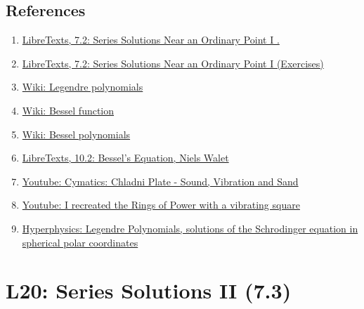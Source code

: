 \documentclass[
  letterpaper,
  DIV=11,
  numbers=noendperiod]{scrreprt}
\theoremstyle{plain}
\theoremstyle{remark}
\begin{document}
\section{References}\label{references-1}

\begin{enumerate}
\def\labelenumi{\arabic{enumi}.}
\item
  \href{https://math.libretexts.org/Courses/Monroe_Community_College/MTH_225_Differential_Equations/7\%3A_Series_Solutions_of_Linear_Second_Order_Equations/7.2\%3A_Series_Solutions_Near_an_Ordinary_Point_I}{LibreTexts,
  7.2: Series Solutions Near an Ordinary Point I .}
\item
  \href{https://math.libretexts.org/Courses/Monroe_Community_College/MTH_225_Differential_Equations/7\%3A_Series_Solutions_of_Linear_Second_Order_Equations/7.2\%3A_Series_Solutions_Near_an_Ordinary_Point_I/7.2E\%3A_Series_Solutions_Near_an_Ordinary_Point_I_(Exercises)}{LibreTexts,
  7.2: Series Solutions Near an Ordinary Point I (Exercises)}
\item
  \href{https://en.wikipedia.org/wiki/Legendre_polynomials}{Wiki:
  Legendre polynomials}
\item
  \href{https://en.wikipedia.org/wiki/Bessel_function}{Wiki: Bessel
  function}
\item
  \href{https://en.wikipedia.org/wiki/Bessel_polynomials}{Wiki: Bessel
  polynomials}
\item
  \href{https://math.libretexts.org/Bookshelves/Differential_Equations/Partial_Differential_Equations_(Walet)/10\%3A_Bessel_Functions_and_Two-Dimensional_Problems/10.02\%3A_Bessel\%E2\%80\%99s_Equation}{LibreTexts,
  10.2: Bessel's Equation, Niels Walet}
\item
  \href{https://youtu.be/tFAcYruShow}{Youtube: Cymatics: Chladni Plate -
  Sound, Vibration and Sand}
\item
  \href{https://youtu.be/rjueHI002Fg}{Youtube: I recreated the Rings of
  Power with a vibrating square}
\item
  \href{http://hyperphysics.phy-astr.gsu.edu/hbase/Math/legend.html}{Hyperphysics:
  Legendre Polynomials, solutions of the Schrodinger equation in
  spherical polar coordinates}
\end{enumerate}


\chapter{L20: Series Solutions II
(7.3)}\label{l20-series-solutions-ii-7.3-1}
\end{document}
